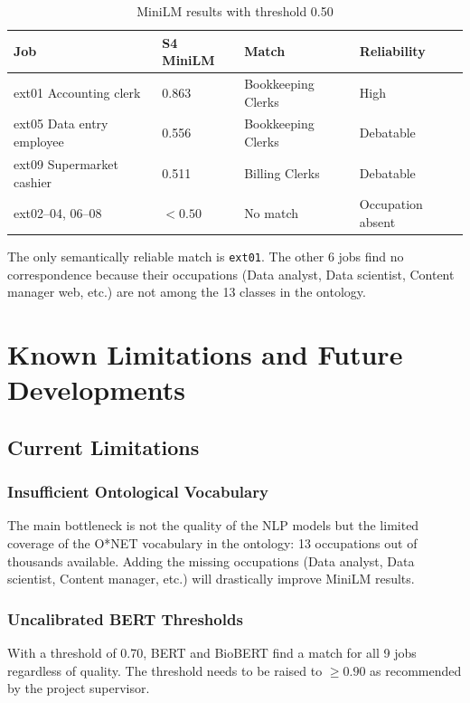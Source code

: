 \documentclass[12pt, a4paper]{report}
\begin{document}
\begin{table}[H]
\centering
\begin{tabular}{llll}
\toprule
\textbf{Job} & \textbf{S4 MiniLM} & \textbf{Match} & \textbf{Reliability} \\
\midrule
ext01 Accounting clerk & 0.863 & Bookkeeping Clerks & High \\
ext05 Data entry employee & 0.556 & Bookkeeping Clerks & Debatable \\
ext09 Supermarket cashier & 0.511 & Billing Clerks & Debatable \\
ext02--04, 06--08 & $< 0.50$ & No match & Occupation absent \\
\bottomrule
\end{tabular}
\caption{MiniLM results with threshold 0.50}
\end{table}

The only semantically reliable match is \texttt{ext01}. The other
6 jobs find no correspondence because their occupations
(Data analyst, Data scientist, Content manager web, etc.) are not
among the 13 classes in the ontology.

% 
\chapter{Known Limitations and Future Developments}
% 

\section{Current Limitations}

\subsection{Insufficient Ontological Vocabulary}

The main bottleneck is not the quality of the NLP models but
the limited coverage of the O*NET vocabulary in the ontology: 13
occupations out of thousands available. Adding the
missing occupations (Data analyst, Data scientist, Content manager, etc.)
will drastically improve MiniLM results.

\subsection{Uncalibrated BERT Thresholds}

With a threshold of 0.70, BERT and BioBERT find a match for all 9 jobs
regardless of quality. The threshold needs to be raised to $\geq 0.90$
as recommended by the project supervisor.
\end{document}
